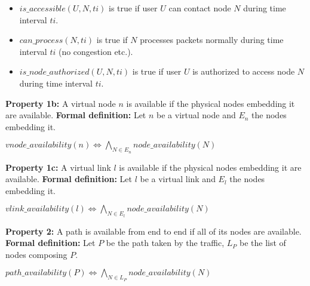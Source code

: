 \begin{itemize}
\item $is\_accessible(U,N,ti)$ is true if user $U$ can contact node $N$ during time interval $ti$.
\item $can\_process(N,ti)$ is true if $N$ processes packets normally during time interval $ti$ (\eg no congestion etc.).
\item $is\_node\_authorized(U,N,ti)$ is true if user $U$ is authorized to access node $N$ during time interval $ti$.
\end{itemize} 

\textbf{Property 1b:} A virtual node $n$ is available if the physical nodes embedding it are available.
\newline
\textbf{Formal definition:} Let $n$ be a virtual node and $E_n$ the nodes embedding it.

\begin{myformula}
$vnode\_availability(n) \Leftrightarrow \bigwedge\limits_{N \in E_n} node\_availability(N)$
\end{myformula}

\textbf{Property 1c:} A virtual link $l$ is available if the physical nodes embedding it are available.
\newline
\textbf{Formal definition:} Let $l$ be a virtual link and $E_l$ the nodes embedding it.

\begin{myformula}
$vlink\_availability(l) \Leftrightarrow \bigwedge\limits_{N \in E_l} node\_availability(N)$
\end{myformula}

\textbf{Property 2:} A path is available from end to end if all of its nodes are available.
\newline \textbf{Formal definition:} Let $P$ be the path taken by the traffic, $L_P$ be the list of nodes composing $P$. 

\begin{myformula}
$path\_availability(P)\Leftrightarrow\bigwedge\limits_{N \in L_P}node\_availability(N)$
\end{myformula}




